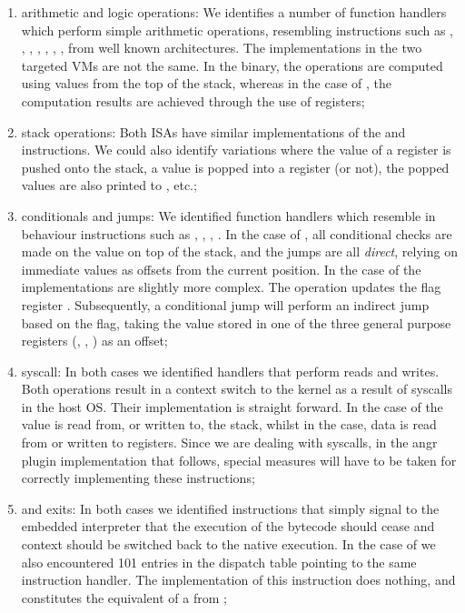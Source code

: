 \begin{enumerate}
    \item arithmetic and logic operations: We identifies a number of function handlers which perform simple arithmetic operations, resembling instructions such as , , , , , , , from well known architectures. The implementations in the two targeted \glspl{VM} are not the same. In the  binary, the operations are computed using values from the top of the stack, whereas in the case of , the computation results are achieved through the use of registers;
    \item stack operations: Both \glspl{ISA} have similar implementations of the  and  instructions. We could also identify variations where the value of a register is pushed onto the stack, a value is popped into a register (or not), the popped values are also printed to , etc.;
    \item conditionals and jumps: We identified function handlers which resemble in behaviour instructions such as , , , . In the case of , all conditional checks are made on the value on top of the stack, and the jumps are all \emph{direct}, relying on immediate values as offsets from the current position. In the case of  the implementations are slightly more complex. The  operation updates the flag register . Subsequently, a conditional jump will perform an indirect jump based on the  flag, taking the value stored in one of the three general purpose registers (, , ) as an offset;
    \item \gls{syscall}: In both cases we identified handlers that perform reads and writes. Both operations result in a context switch to the kernel as a result of \glspl{syscall} in the host \gls{OS}. Their implementation is straight forward. In the case of  the value is read from, or written to, the stack, whilst in the  case, data is read from or written to registers. Since we are dealing with \glspl{syscall}, in the angr plugin implementation that follows, special measures will have to be taken for correctly implementing these instructions;
    \item {} and exits: In both cases we identified  instructions that simply signal to the embedded interpreter that the execution of the bytecode should cease and context should be switched back to the native execution. In the case of  we also encountered 101 entries in the dispatch table pointing to the same instruction handler. The implementation of this instruction does nothing, and constitutes the equivalent of a  from ;

\end{enumerate}
